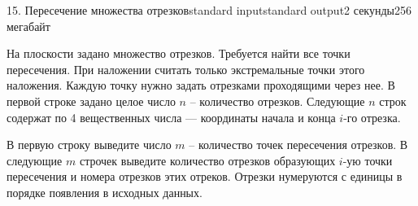 \begin{problem}{15. Пересечение множества отрезков}{standard input}{standard output}{2 секунды}{256 мегабайт}

На плоскости задано множество отрезков. Требуется найти все точки пересечения.
При наложении считать только экстремальные точки этого наложения.
Каждую точку нужно задать отрезками проходящими через нее.
\InputFile
В первой строке задано целое число $n$ -- количество отрезков.
Следующие $n$ строк содержат по 4 вещественных числа — координаты начала и конца $i$-го отрезка.

\OutputFile
В первую строку выведите число $m$ -- количество точек пересечения отрезков.
В следующие $m$ строчек выведите количество отрезков образующих $i$-ую точки пересечения и номера отрезков этих отреков. Отрезки нумеруются с единицы в порядке появления в исходных данных.  
\Examples

\begin{example}%
%
\end{example}

\end{problem}